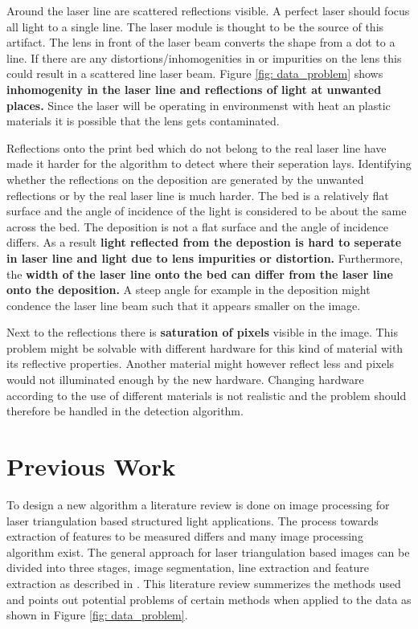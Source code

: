 \skippar
Around the laser line are scattered reflections visible. A perfect laser should focus all light to a single line. The laser module is thought to be the source of this artifact. The lens in front of the laser beam converts the shape from a dot to a line. If there are any distortions/inhomogenities in or impurities on the lens this could result in a scattered line laser beam. Figure \ref{fig: data_problem} shows \textbf{inhomogenity in the laser line and reflections of light at unwanted places.} Since the laser will be operating in environmenst with heat an plastic materials it is possible that the lens gets contaminated. 

Reflections onto the print bed which do not belong to the real laser line have made it harder for the algorithm to detect where their seperation lays. Identifying whether the reflections on the deposition are generated by the unwanted reflections or by the real laser line is much harder.  The bed is a relatively flat surface and the angle of incidence of the light is considered to be about the same across the bed. The deposition is not a flat surface and the angle of incidence differs. As a result \textbf{light reflected from the depostion is hard to  seperate in laser line and light due to lens impurities or distortion.} Furthermore, the \textbf{width of the laser line onto the bed can differ from the laser line onto the deposition.} A steep angle for example in the deposition might condence the laser line beam such that it appears smaller on the image.

Next to the reflections there is \textbf{saturation of pixels} visible in the image. This problem might be solvable with different hardware for this kind of material with its reflective properties. Another material might however reflect less and pixels would not illuminated enough by the new hardware. Changing hardware according to the use of different materials is not realistic and the problem should therefore be handled in the detection algorithm.

\section{Previous Work} \label{sc: previous_work}
To design a new algorithm a literature review is done on image processing for laser triangulation based structured light applications. The process towards extraction of features to be measured differs and many image processing algorithm exist. The general approach for laser triangulation based images can be divided into three stages, image segmentation, line extraction and feature extraction as described in \cite{li2007recent}. This literature review summerizes the methods used and points out potential problems of certain methods when applied to the data as shown in Figure \ref{fig: data_problem}.

